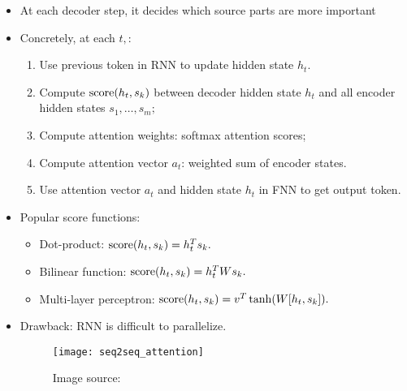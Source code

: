 \documentclass[../ds]{subfiles}
\begin{document}
\begin{itemize}
\item 
At each decoder step, it decides which source parts are more important

\item Concretely, at each $t,$:
	\begin{enumerate}[label=(\roman*)]
	\item
	Use previous token in RNN to update hidden state $h_t.$
	
	\item 
	Compute  $\operatorname{score}(h_t,s_k)$ between decoder hidden state $h_t$ and all encoder hidden states $s_1,\ldots,s_m;$
	
	\item 
	Compute attention weights: softmax attention scores;
	
	\item 
	Compute attention vector $a_t$: weighted sum of encoder states.
	
	\item 
	Use attention vector $a_t$ and hidden state $h_t$ in FNN to get output token.
	\end{enumerate}

\item Popular score functions:
	\begin{itemize}
	\item 
	Dot-product: $\operatorname{score}(h_t,s_k) = h_t^T s_k.$
	
	\item 
	Bilinear function: $\operatorname{score}(h_t,s_k) = h_t^T W s_k.$
	
	\item 
	Multi-layer perceptron: $\operatorname{score}(h_t,s_k) = v^T\tanh(W[h_t,s_k]).$
	\end{itemize}

\item Drawback: RNN is difficult to parallelize.

\begin{figure}[ht]
	\centering
	\texttt{[image: seq2seq\_attention]}
	\caption*{Image source: \cite{seq2seq_voita}}
\end{figure}
\end{itemize}
\end{document}
